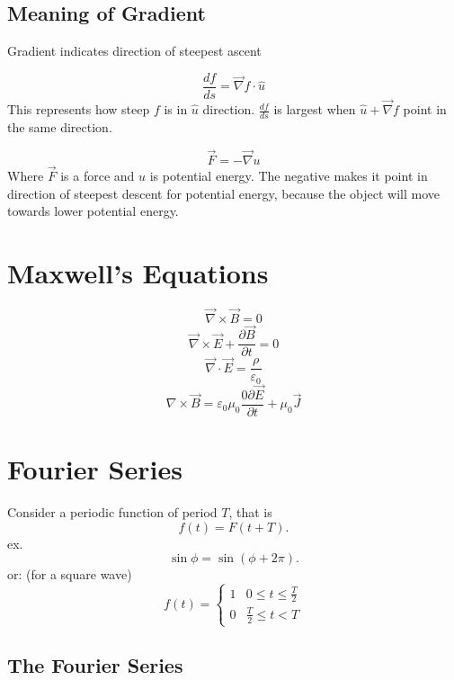 \subsection{Meaning of Gradient}
Gradient indicates direction of steepest ascent

\begin{equation}
	\frac{df}{ds}=\vec{\nabla}f\cdot\hat{u}
\end{equation}
This represents how steep $ f $ is in $ \hat{u} $ direction. $ \frac{df}{ds} $ is largest when $ \hat{u}+\vec{\nabla}f $ point in the same direction.

\begin{equation}
	\vec{F}=-\vec{\nabla}u
\end{equation}
Where $ \vec{F} $ is a force and $ u $ is potential energy. The negative makes it point in direction of steepest descent for potential energy, because the object will move towards lower potential energy.

\section{Maxwell's Equations}
\begin{equation}
	\vec{\nabla}\times \vec{B}=0
\end{equation}
\begin{equation}
	\vec{\nabla}\times \vec{E}+\frac{\partial\vec{B}}{\partial t}=0
\end{equation}
\begin{equation}
	\vec{\nabla}\cdot \vec{E}=\frac{\rho}{\varepsilon_0}
\end{equation}
\begin{equation}
	\nabla \times \vec{B}=\varepsilon_0\mu_0\frac{0\partial\vec{E}}{\partial t}+\mu_0\vec{J}
\end{equation}



\section{Fourier Series}
Consider a periodic function of period $ T $, that is
\[f(t)=F(t+T).\] ex. 
\[\sin\phi=\sin(\phi+2\pi).\] 
or: (for a square wave)
\[
f(t)=
\begin{cases}
	1 & 0\leq t\leq \frac{T}{2}\\
	0 & \frac{T}{2}\leq t<T
\end{cases}\] 

\subsection{The Fourier Series}

